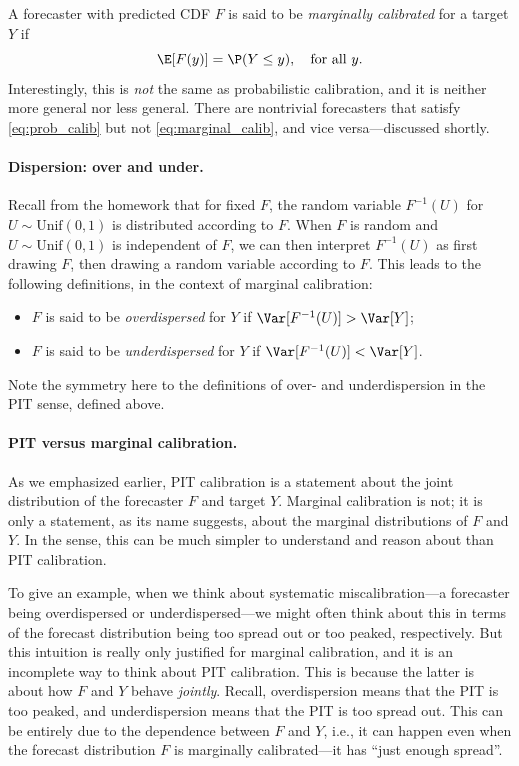 \documentclass{article}
\begin{document}
A forecaster with predicted CDF $F$ is said to be \emph{marginally calibrated}
for a target $Y$ if  
\begin{equation}
\label{eq:marginal_calib}
\E[F(y)] = \P(Y \leq y), \quad \text{for all $y$}.  
\end{equation}
Interestingly, this is \emph{not} the same as probabilistic calibration, and it
is neither more general nor less general. There are nontrivial forecasters that
satisfy \eqref{eq:prob_calib} but not \eqref{eq:marginal_calib}, and vice
versa---discussed shortly. 

\paragraph{Dispersion: over and under.}

Recall from the homework that for fixed $F$, the random variable $F^{-1}(U)$ for 
$U \sim \mathrm{Unif}(0,1)$ is distributed according to $F$. When $F$ is random
and $U \sim \mathrm{Unif}(0,1)$ is independent of $F$, we can then interpret
$F^{-1}(U)$ as first drawing $F$, then drawing a random variable according to
$F$. This leads to the following definitions, in the context of marginal
calibration:   

\begin{itemize}
\item $F$ is said to be \emph{overdispersed} for $Y$ if $\Var[F^{-1}(U)] > \Var[Y]$;
\item $F$ is said to be \emph{underdispersed} for $Y$ if $\Var[F^{-1}(U)] < \Var[Y]$.
\end{itemize}

Note the symmetry here to the definitions of over- and underdispersion in the
PIT sense, defined above. 

\paragraph{PIT versus marginal calibration.}

As we emphasized earlier, PIT calibration is a statement about the joint
distribution of the forecaster $F$ and target $Y$. Marginal calibration is not;
it is only a statement, as its name suggests, about the marginal distributions
of $F$ and $Y$. In the sense, this can be much simpler to understand and reason
about than PIT calibration.

To give an example, when we think about systematic miscalibration---a forecaster 
being overdispersed or underdispersed---we might often think about this in terms 
of the forecast distribution being too spread out or too peaked, respectively.
But this intuition is really only justified for marginal calibration, and it is an
incomplete way to think about PIT calibration. This is because the latter is
about how $F$ and $Y$ behave \emph{jointly}. Recall, overdispersion means that
the PIT is too peaked, and underdispersion means that the PIT is too spread
out. This can be entirely due to the dependence between $F$ and $Y$, i.e., it
can happen even when the forecast distribution $F$ is marginally calibrated---it
has ``just enough spread''.
\end{document}
